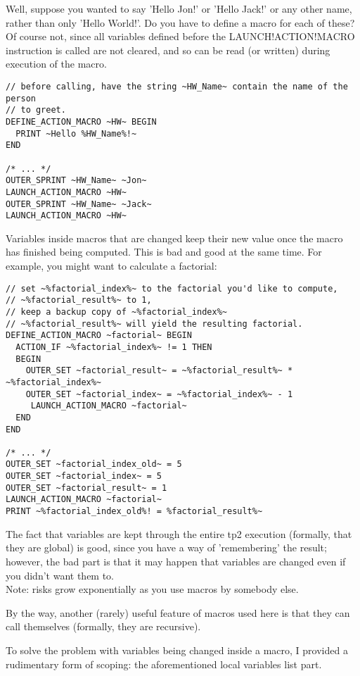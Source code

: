 \documentclass{article}
\begin{document}
Well, suppose you wanted to say 'Hello Jon!' or 'Hello Jack!' or any other
name, rather than only 'Hello World!'. Do you have to define a macro for each
of these? Of course not, since all variables defined before the LAUNCH!ACTION!MACRO
instruction is called are not cleared, and so can be read (or written) during execution of the macro.

\begin{verbatim}
// before calling, have the string ~HW_Name~ contain the name of the person
// to greet.
DEFINE_ACTION_MACRO ~HW~ BEGIN
  PRINT ~Hello %HW_Name%!~
END

/* ... */
OUTER_SPRINT ~HW_Name~ ~Jon~
LAUNCH_ACTION_MACRO ~HW~
OUTER_SPRINT ~HW_Name~ ~Jack~
LAUNCH_ACTION_MACRO ~HW~
\end{verbatim}

Variables inside macros that are changed keep their new value once the
macro has finished being computed. This is bad and good at the same time.
For example, you might want to calculate a factorial:
\begin{verbatim}
// set ~%factorial_index%~ to the factorial you'd like to compute,
// ~%factorial_result%~ to 1,
// keep a backup copy of ~%factorial_index%~
// ~%factorial_result%~ will yield the resulting factorial.
DEFINE_ACTION_MACRO ~factorial~ BEGIN
  ACTION_IF ~%factorial_index%~ != 1 THEN
  BEGIN
    OUTER_SET ~factorial_result~ = ~%factorial_result%~ * ~%factorial_index%~
    OUTER_SET ~factorial_index~ = ~%factorial_index%~ - 1
     LAUNCH_ACTION_MACRO ~factorial~
  END
END

/* ... */
OUTER_SET ~factorial_index_old~ = 5
OUTER_SET ~factorial_index~ = 5
OUTER_SET ~factorial_result~ = 1
LAUNCH_ACTION_MACRO ~factorial~
PRINT ~%factorial_index_old%! = %factorial_result%~
\end{verbatim}
The fact that variables are kept through the entire tp2 execution (formally,
that they are global) is good, since you have a way of 'remembering' the result;
however, the bad part is that it may happen that variables are changed even if you
didn't want them to.\\
Note: risks grow exponentially as you use macros by somebody else.

By the way, another (rarely) useful feature of macros used here is that they
can call themselves (formally, they are recursive).

To solve the problem with variables being changed inside a macro, I provided
a rudimentary form of scoping: the aforementioned local variables list part.
\end{document}
